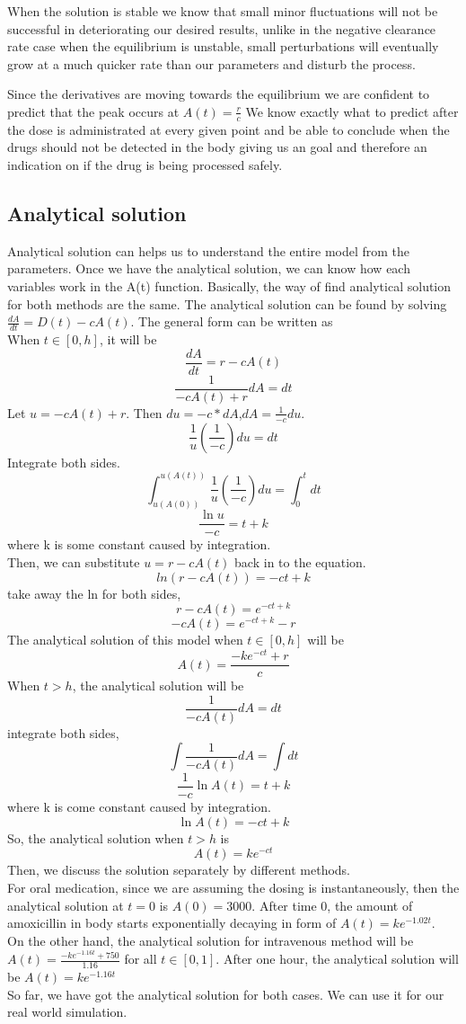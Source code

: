 \documentclass{article}
\begin{document}
When the solution is stable we know that small minor fluctuations will not be successful in deteriorating our desired results, unlike in the negative clearance rate case when the equilibrium is unstable, small perturbations will eventually grow at a much quicker rate than our parameters and disturb the process.

Since the derivatives are moving towards the equilibrium we are confident to predict that the peak occurs at $A(t) = \frac{r}{c}$
We know exactly what to predict after the dose is administrated at every given point and be able to conclude when the drugs should not be detected in the body giving us an goal and therefore an indication on if the drug is being processed safely. 



\subsection*{Analytical solution}
Analytical solution can helps us to understand the entire model from the parameters. Once we have the analytical solution, we can know how each variables work in the A(t) function. Basically, the way of find analytical solution for both methods are the same. The analytical solution can be found by solving $\frac{dA}{dt} = D(t) - cA(t)$. The general form can be written as\\

When $t \in [0,h]$, it will be 
$$
\frac{dA}{dt} = r - cA(t)
$$
$$
\frac{1}{-cA(t)+r}dA = dt
$$
Let $u = -cA(t) + r$. Then $du = -c*dA$,$dA = \frac{1}{-c}du$.
$$
\frac{1}{u}(\frac{1}{-c})du = dt
$$
Integrate both sides.
$$
\int_{u(A(0))}^{u(A(t))} \frac{1}{u}(\frac{1}{-c}) du = \int_{0}^{t} dt
$$
$$
\frac{\ln u}{-c} = t + k
$$
where k is some constant caused by integration.\\
Then, we can substitute $u = r- cA(t)$ back in to the equation.
$$
ln(r-cA(t)) = -ct+k
$$
take away the ln for both sides,
$$
r-cA(t) = e^{-ct+k}
$$
$$
-cA(t)= e^{-ct+k}-r
$$
$$
$$
The analytical solution of this model when $t \in [0,h]$ will be
$$
A(t) = \frac{-ke^{-ct}+r}{c}
$$
When $t > h$, the analytical solution will be
$$
\frac{1}{-cA(t)}dA = dt
$$
integrate both sides,
$$
\int \frac{1}{-cA(t)} dA = \int dt
$$
$$
\frac{1}{-c} \ln{A(t)} = t + k
$$
where k is come constant caused by integration.\\
$$
\ln{A(t)} = -ct+k
$$
So, the analytical solution when $t > h$ is
$$
A(t) = ke^{-ct}
$$
Then, we discuss the solution separately by different methods.\\
For oral medication, since we are assuming the dosing is instantaneously, then the analytical solution at $t = 0$ is $A(0) = 3000$. After time 0, the amount of amoxicillin in body starts exponentially decaying in form of $A(t) = ke^{-1.02t}$.\\
On the other hand, the analytical solution for intravenous method will be $A(t) = \frac{-ke^{-1.16t}+750}{1.16}$ for all $t \in [0,1]$. After one hour, the analytical solution will be $A(t) = ke^{-1.16t}$\\
So far, we have got the analytical solution for both cases. We can use it for our real world simulation.
\end{document}
